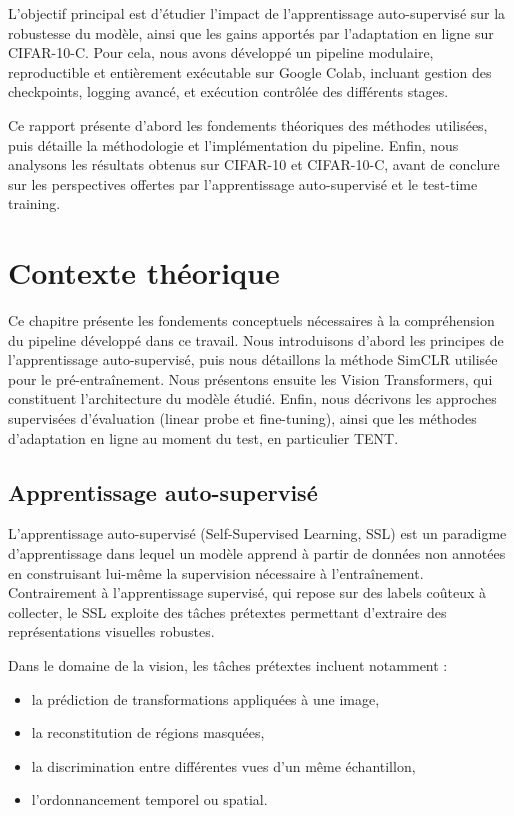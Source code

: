 \documentclass[12pt,a4paper]{report}
\begin{document}
	L’objectif principal est d’étudier l’impact de l’apprentissage auto-supervisé sur la robustesse du modèle, ainsi que les gains apportés par l’adaptation en ligne sur CIFAR-10-C. Pour cela, nous avons développé un pipeline modulaire, reproductible et entièrement exécutable sur Google Colab, incluant gestion des checkpoints, logging avancé, et exécution contrôlée des différents stages.
	
	Ce rapport présente d’abord les fondements théoriques des méthodes utilisées, puis détaille la méthodologie et l’implémentation du pipeline. Enfin, nous analysons les résultats obtenus sur CIFAR-10 et CIFAR-10-C, avant de conclure sur les perspectives offertes par l’apprentissage auto-supervisé et le test-time training.
	
	
	\chapter{Contexte théorique}
	Ce chapitre présente les fondements conceptuels nécessaires à la compréhension du pipeline développé dans ce travail. Nous introduisons d’abord les principes de l’apprentissage auto-supervisé, puis nous détaillons la méthode SimCLR utilisée pour le pré-entraînement. Nous présentons ensuite les Vision Transformers, qui constituent l’architecture du modèle étudié. Enfin, nous décrivons les approches supervisées d’évaluation (linear probe et fine-tuning), ainsi que les méthodes d’adaptation en ligne au moment du test, en particulier TENT.
	
	\section{Apprentissage auto-supervisé}
	
	L’apprentissage auto-supervisé (Self-Supervised Learning, SSL) est un paradigme d’apprentissage dans lequel un modèle apprend à partir de données non annotées en construisant lui-même la supervision nécessaire à l’entraînement. Contrairement à l’apprentissage supervisé, qui repose sur des labels coûteux à collecter, le SSL exploite des tâches prétextes permettant d’extraire des représentations visuelles robustes.
	
	Dans le domaine de la vision, les tâches prétextes incluent notamment :
	\begin{itemize}
		\item la prédiction de transformations appliquées à une image,
		\item la reconstitution de régions masquées,
		\item la discrimination entre différentes vues d’un même échantillon,
		\item l’ordonnancement temporel ou spatial.
	\end{itemize}
	
\end{document}
